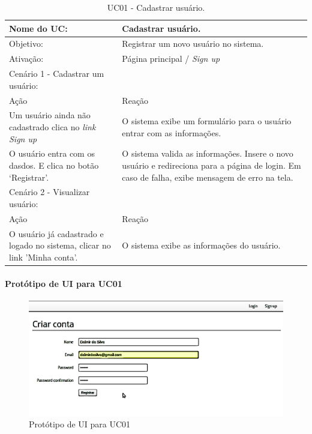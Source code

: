 \documentclass[11pt]{article}
\begin{document}
      \begin{table}[h]
        \begin{center}
          \begin{tabular}{ | p{7cm} | p{8cm} | }
            \hline
            Nome do UC: \cellcolor{gray} & Cadastrar usuário. \\
            \hline
            Objetivo: \cellcolor{gray} & Registrar um novo usuário no sistema. \\
            \hline
            Ativação: \cellcolor{gray} & Página principal / \em Sign up \\
            \hline
            \hline
            Cenário 1 - Cadastrar um usuário: &  \\
            \hline
            Ação\cellcolor{gray} & Reação\cellcolor{gray} \\
            \hline
            Um usuário ainda não cadastrado clica no \em link Sign up & O sistema exibe um formulário para o usuário entrar com as informações. \\
            \hline
            O usuário entra com os dasdos. E clica no botão ‘Registrar’. & O sistema valida as informações. Insere o novo usuário e redireciona para a página de login. Em caso de falha, exibe mensagem de erro na tela. \\
            \hline
            \hline
            Cenário 2 - Visualizar usuário: &  \\
            \hline
            Ação\cellcolor{gray} & Reação\cellcolor{gray} \\
            \hline
            O usuário já cadastrado e logado no sistema, clicar no link 'Minha conta'. & O sistema exibe as informações do usuário. \\
            \hline
          \end{tabular}
          \caption{UC01 - Cadastrar usuário.}
        \end{center}
      \end{table}

      \paragraph{Protótipo de UI para UC01} \hspace{10pt}
      
      \begin{figure}[h!]
        \centering
        \includegraphics[width=.9\textwidth]{create_user.png}
        \caption{Protótipo de UI para UC01}
      \end{figure}
\end{document}
